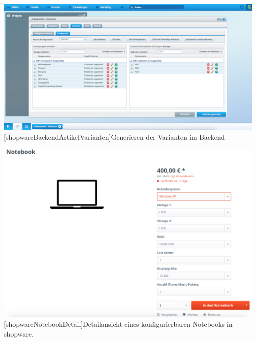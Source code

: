 \begin{appendix}
\vspace{1em}
\begin{minipage}{\linewidth}
	\centering
	\includegraphics[width=1\linewidth]{Abbildungen/shopwareBackendArtikelVarianten.png}
	[shopwareBackendArtikelVarianten]{Generieren der Varianten im Backend}
	\label{app:shopwareBackendArtikelVarianten}
\end{minipage}
\vspace{1em}

\vspace{1em}
\begin{minipage}{\linewidth}
	\centering
	\includegraphics[width=1\linewidth]{Abbildungen/shopwareNotebookDetail.png}
	[shopwareNotebookDetail]{Detailansicht eines konfigurierbaren Notebooks in shopware.}
	\label{app:shopwareNotebookDetail}
\end{minipage}
\vspace{1em}


\end{appendix}
